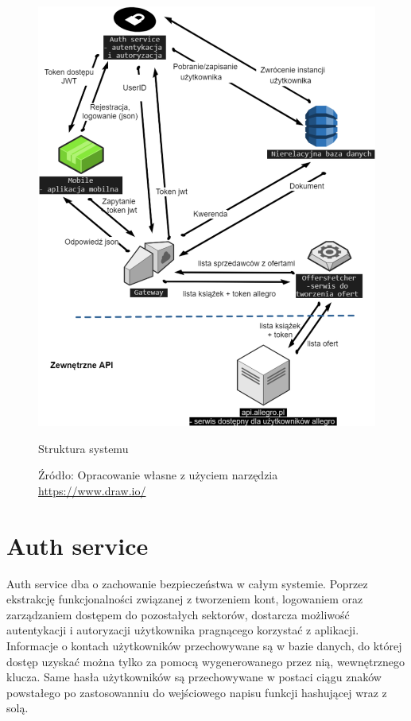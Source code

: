 \begin{figure}[H]
	\centering
	\includegraphics[width=\linewidth]{architecture_overview.pdf}
	\caption{Struktura systemu}
	\caption*{Źródło: {Opracowanie własne z użyciem narzędzia \url{https://www.draw.io/}}}
\end{figure}

\section{Auth service}
Auth service dba o zachowanie bezpieczeństwa w całym systemie.
Poprzez ekstrakcję funkcjonalności związanej z tworzeniem kont, logowaniem oraz zarządzaniem dostępem do pozostałych sektorów, dostarcza możliwość autentykacji i autoryzacji użytkownika pragnącego korzystać z aplikacji.
Informacje o kontach użytkowników przechowywane są w bazie danych, do której dostęp uzyskać można tylko za pomocą wygenerowanego przez nią, wewnętrznego klucza. Same hasła użytkowników są przechowywane w postaci ciągu znaków powstałego po zastosowanniu do wejściowego napisu funkcji hashującej wraz z solą.

